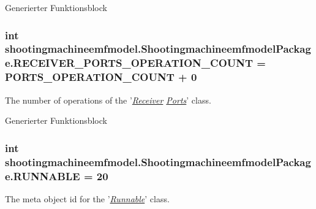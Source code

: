 Generierter Funktionsblock  \hypertarget{interfaceshootingmachineemfmodel_1_1_shootingmachineemfmodel_package_a784cd8ee08945f45f89ceb08f5a717e5}{
\subsubsection[{R\-E\-C\-E\-I\-V\-E\-R\-\_\-\-P\-O\-R\-T\-S\-\_\-\-O\-P\-E\-R\-A\-T\-I\-O\-N\-\_\-\-C\-O\-U\-N\-T}]{\setlength{\rightskip}{0pt plus 5cm}int shootingmachineemfmodel.\-Shootingmachineemfmodel\-Package.\-R\-E\-C\-E\-I\-V\-E\-R\-\_\-\-P\-O\-R\-T\-S\-\_\-\-O\-P\-E\-R\-A\-T\-I\-O\-N\-\_\-\-C\-O\-U\-N\-T = {\bf P\-O\-R\-T\-S\-\_\-\-O\-P\-E\-R\-A\-T\-I\-O\-N\-\_\-\-C\-O\-U\-N\-T} + 0}}\label{interfaceshootingmachineemfmodel_1_1_shootingmachineemfmodel_package_a784cd8ee08945f45f89ceb08f5a717e5}
The number of operations of the '{\itshape \hyperlink{interfaceshootingmachineemfmodel_1_1_receiver}{Receiver} \hyperlink{interfaceshootingmachineemfmodel_1_1_ports}{Ports}}' class.

Generierter Funktionsblock  \hypertarget{interfaceshootingmachineemfmodel_1_1_shootingmachineemfmodel_package_a677df60e3408957ae1a09879e817b6e4}{
\subsubsection[{R\-U\-N\-N\-A\-B\-L\-E}]{\setlength{\rightskip}{0pt plus 5cm}int shootingmachineemfmodel.\-Shootingmachineemfmodel\-Package.\-R\-U\-N\-N\-A\-B\-L\-E = 20}}\label{interfaceshootingmachineemfmodel_1_1_shootingmachineemfmodel_package_a677df60e3408957ae1a09879e817b6e4}
The meta object id for the '\hyperlink{classshootingmachineemfmodel_1_1impl_1_1_runnable_impl}{{\itshape Runnable}}' class.

